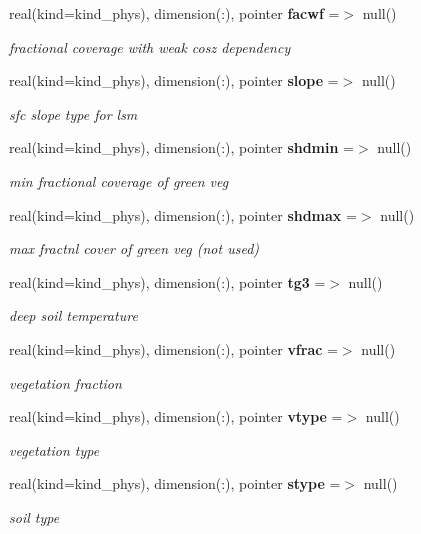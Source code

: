 \begin{DoxyCompactItemize}
real(kind=kind\+\_\+phys), dimension(\+:), pointer \textbf{ facwf} =$>$ null()
\begin{DoxyCompactList}\small\item\em fractional coverage with weak cosz dependency \end{DoxyCompactList}\item 
real(kind=kind\+\_\+phys), dimension(\+:), pointer \textbf{ slope} =$>$ null()
\begin{DoxyCompactList}\small\item\em sfc slope type for lsm \end{DoxyCompactList}\item 
real(kind=kind\+\_\+phys), dimension(\+:), pointer \textbf{ shdmin} =$>$ null()
\begin{DoxyCompactList}\small\item\em min fractional coverage of green veg \end{DoxyCompactList}\item 
real(kind=kind\+\_\+phys), dimension(\+:), pointer \textbf{ shdmax} =$>$ null()
\begin{DoxyCompactList}\small\item\em max fractnl cover of green veg (not used) \end{DoxyCompactList}\item 
real(kind=kind\+\_\+phys), dimension(\+:), pointer \textbf{ tg3} =$>$ null()
\begin{DoxyCompactList}\small\item\em deep soil temperature \end{DoxyCompactList}\item 
real(kind=kind\+\_\+phys), dimension(\+:), pointer \textbf{ vfrac} =$>$ null()
\begin{DoxyCompactList}\small\item\em vegetation fraction \end{DoxyCompactList}\item 
real(kind=kind\+\_\+phys), dimension(\+:), pointer \textbf{ vtype} =$>$ null()
\begin{DoxyCompactList}\small\item\em vegetation type \end{DoxyCompactList}\item 
real(kind=kind\+\_\+phys), dimension(\+:), pointer \textbf{ stype} =$>$ null()
\begin{DoxyCompactList}\small\item\em soil type \end{DoxyCompactList}\item 

\end{DoxyCompactItemize}
